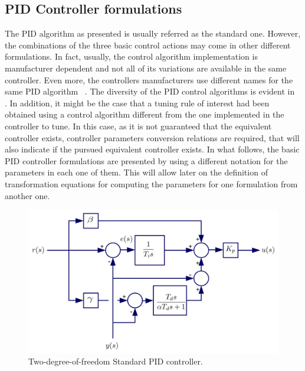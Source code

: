 \subsection{PID Controller formulations}
\label{sec:3.1}
The PID algorithm as presented is usually referred as the standard one. However, the combinations of the three basic control actions may come in other different formulations. In fact, usually, the control algorithm implementation is manufacturer dependent and not all of its variations are available in the same controller. Even more, the controllers manufacturers use different names for the same PID algorithm~\citep{gerry1987} \citep{vilanova2017WEE}.  The diversity of the PID control algorithms is evident in~\citet{odwyer2006} .  In addition, it might be the case that a tuning rule of interest had been obtained using a control algorithm different from the one implemented in the controller to tune. In this case, as it is not guaranteed that the equivalent controller exists, controller parameters conversion relations are required, that will also indicate if the pursued equivalent controller exists. In what follows, the basic PID controller formulations are presented by using a different notation for the parameters in each one of them. This will allow later on the definition of transformation equations for computing the parameters for one formulation from another one.

\begin{figure}[tb]
\centering
\includegraphics[width=\linewidth]{../figuras/Ch2PID_Schema} 
\caption{Two-degree-of-freedom Standard PID controller.} 
\label{Ch2fig:PID_Schema}
\end{figure}



